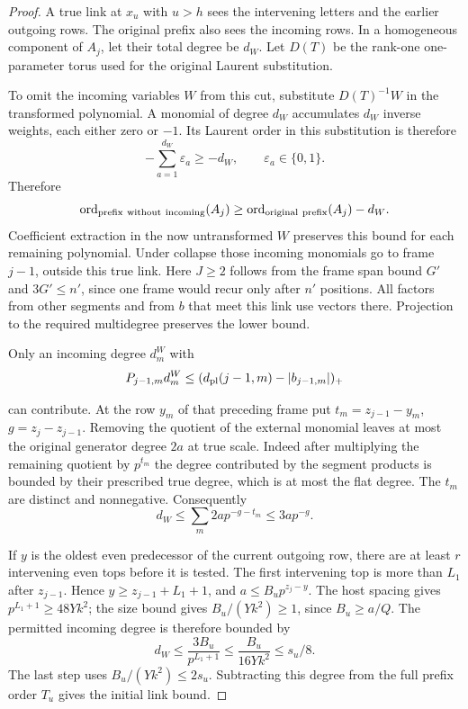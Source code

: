 \begin{proof}
A true link at \(x_u\) with \(u>h\) sees the intervening letters
and the earlier outgoing rows. The original prefix also sees the
incoming rows. In a homogeneous component of \(A_j\), let their
total degree be \(d_W\). Let \(D(T)\) be the rank-one one-parameter torus
used for the original Laurent substitution.

To omit the
incoming variables \(W\) from this cut, substitute \(D(T)^{-1}W\)
in the transformed polynomial. A monomial of degree \(d_W\) accumulates \(d_W\) inverse weights, each either zero or \(-1\). Its Laurent order in this substitution is therefore
\[
 -\sum_{a=1}^{d_W}\varepsilon_a\ge-d_W,\qquad \varepsilon_a\in\{0,1\}.
\]
Therefore
\[
 \operatorname{ord}_{\rm prefix\ without\ incoming}(A_j)
 \ge \operatorname{ord}_{\rm original\ prefix}(A_j)-d_W .
\]
Coefficient extraction in the now untransformed \(W\)
preserves this bound for each remaining polynomial. Under collapse those incoming monomials go to frame
\(j-1\), outside this true link. Here \(J\ge2\) follows from the
frame span bound \(G'\) and \(3G'\le n'\), since one frame would
recur only after \(n'\) positions. All factors from other
segments and from \(b\) that meet this link use vectors there.
Projection to the required multidegree preserves the lower bound.

Only an incoming degree \(d_m^W\) with
\[
 P_{j-1,m}d_m^W\le (d_{\rm pl}(j-1,m)-|b_{j-1,m}|)_+
\]

can contribute. At the row \(y_m\) of that preceding frame put
\(t_m=z_{j-1}-y_m\), \(g=z_j-z_{j-1}\). Removing the quotient
of the external monomial leaves at most the original generator
degree \(2a\) at true scale. Indeed after multiplying the
remaining quotient by \(p^{t_m}\) the degree contributed by
the segment products is bounded by their prescribed true degree,
which is at most the flat degree. The \(t_m\) are distinct and
nonnegative. Consequently
\[
 d_W\le\sum_m 2a p^{-g-t_m}\le 3a p^{-g}.
\]

If \(y\) is the oldest even predecessor of the current outgoing
row, there are at least \(r\) intervening even tops before it is
tested. The first intervening top is more than \(L_1\) after
\(z_{j-1}\). Hence \(y\ge z_{j-1}+L_1+1\), and
\(a\le B_u p^{z_j-y}\). The host spacing gives
\(p^{L_1+1}\ge48Yk^2\); the size bound gives
\(B_u/(Yk^2)\ge1\), since \(B_u\ge a/Q\).
The permitted incoming degree is therefore bounded by
\[
 d_W\le \frac{3B_u}{p^{L_1+1}}
     \le \frac{B_u}{16Yk^2}\le s_u/8 .
\]
The last step uses \(B_u/(Yk^2)\le2s_u\).
Subtracting this degree from the full prefix order \(T_u\)
gives the initial link bound.


\end{proof}
